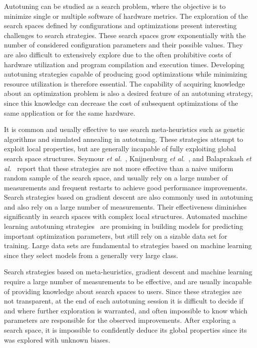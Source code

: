\documentclass[conference]{IEEEtran}
\begin{document}
Autotuning can be studied as a search problem, where the objective is to
minimize single or multiple software of hardware metrics. The exploration of the
search spaces defined by configurations and optimizations present interesting
challenges to search strategies. These search spaces grow exponentially with the
number of considered configuration parameters and their possible values. They
are also difficult to extensively explore due to the often prohibitive costs of
hardware utilization and program compilation and execution times. Developing
autotuning strategies capable of producing good optimizations while minimizing
resource utilization is therefore essential. The capability of acquiring
knowledge about an optimization problem is also a desired feature of an
autotuning strategy, since this knowledge can decrease the cost of subsequent
optimizations of the same application or for the same hardware.

It is common and usually effective to use search meta-heuristics such as genetic
algorithms and simulated annealing in autotuning. These strategies attempt to
exploit local properties, but are generally incapable of fully exploiting global
search space structures. Seymour \emph{et al.}~\cite{seymour2008comparison},
Knijnenburg \emph{et al.}~\cite{knijnenburg2003combined}, and Balaprakash \emph{et
al.}~\cite{balaprakash2011can,balaprakash2012experimental} report that
these strategies are not more effective than a naive uniform random sample of
the search space, and usually rely on a large number of measurements and
frequent restarts to achieve good performance improvements. Search strategies
based on gradient descent are also commonly used in autotuning and also rely on
a large number of measurements. Their effectiveness diminishes significantly in
search spaces with complex local structures. Automated machine learning
autotuning
strategies~\cite{beckingsale2017apollo,falch2017machine,balaprakash2016automomml}
are promising in building models for predicting important optimization
parameters, but still rely on a sizable data set for training. Large data sets
are fundamental to strategies based on machine learning since they select models
from a generally very large class.

Search strategies based on meta-heuristics, gradient descent and machine
learning require a large number of measurements to be effective, and are usually
incapable of providing knowledge about search spaces to users. Since these
strategies are not transparent, at the end of each autotuning session it is
difficult to decide if and where further exploration is warranted, and
often impossible to know which parameters are responsible for the observed
improvements. After exploring a search space, it is impossible to confidently
deduce its global properties since its was explored with unknown biases.
\end{document}
